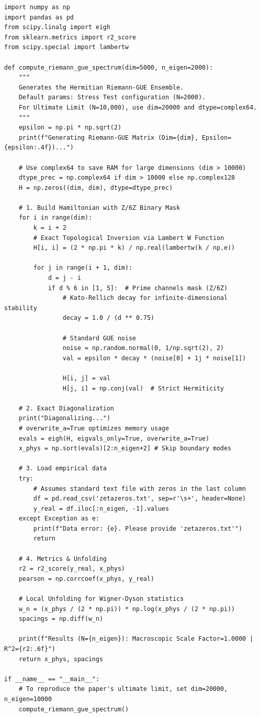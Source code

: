 \documentclass[prl,aps,floatfix,superscriptaddress,10pt]{revtex4-2}
\begin{document}
\begin{lstlisting}
import numpy as np
import pandas as pd
from scipy.linalg import eigh
from sklearn.metrics import r2_score
from scipy.special import lambertw

def compute_riemann_gue_spectrum(dim=5000, n_eigen=2000):
    """
    Generates the Hermitian Riemann-GUE Ensemble.
    Default params: Stress Test configuration (N=2000).
    For Ultimate Limit (N=10,000), use dim=20000 and dtype=complex64.
    """
    epsilon = np.pi * np.sqrt(2)
    print(f"Generating Riemann-GUE Matrix (Dim={dim}, Epsilon={epsilon:.4f})...")
    
    # Use complex64 to save RAM for large dimensions (dim > 10000)
    dtype_prec = np.complex64 if dim > 10000 else np.complex128
    H = np.zeros((dim, dim), dtype=dtype_prec)
    
    # 1. Build Hamiltonian with Z/6Z Binary Mask
    for i in range(dim):
        k = i + 2 
        # Exact Topological Inversion via Lambert W Function
        H[i, i] = (2 * np.pi * k) / np.real(lambertw(k / np.e))
        
        for j in range(i + 1, dim):
            d = j - i
            if d % 6 in [1, 5]:  # Prime channels mask (Z/6Z)
                # Kato-Rellich decay for infinite-dimensional stability
                decay = 1.0 / (d ** 0.75) 
                
                # Standard GUE noise
                noise = np.random.normal(0, 1/np.sqrt(2), 2)
                val = epsilon * decay * (noise[0] + 1j * noise[1])
                
                H[i, j] = val
                H[j, i] = np.conj(val)  # Strict Hermiticity

    # 2. Exact Diagonalization
    print("Diagonalizing...")
    # overwrite_a=True optimizes memory usage
    evals = eigh(H, eigvals_only=True, overwrite_a=True)
    x_phys = np.sort(evals)[2:n_eigen+2] # Skip boundary modes
    
    # 3. Load empirical data
    try:
        # Assumes standard text file with zeros in the last column
        df = pd.read_csv('zetazeros.txt', sep=r'\s+', header=None)
        y_real = df.iloc[:n_eigen, -1].values
    except Exception as e:
        print(f"Data error: {e}. Please provide 'zetazeros.txt'")
        return
    
    # 4. Metrics & Unfolding
    r2 = r2_score(y_real, x_phys)
    pearson = np.corrcoef(x_phys, y_real)
    
    # Local Unfolding for Wigner-Dyson statistics
    w_n = (x_phys / (2 * np.pi)) * np.log(x_phys / (2 * np.pi))
    spacings = np.diff(w_n)
    
    print(f"Results (N={n_eigen}): Macroscopic Scale Factor=1.0000 | R^2={r2:.6f}")
    return x_phys, spacings

if __name__ == "__main__":
    # To reproduce the paper's ultimate limit, set dim=20000, n_eigen=10000
    compute_riemann_gue_spectrum()
\end{lstlisting}
\end{document}
